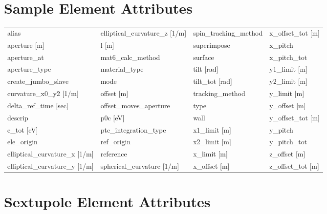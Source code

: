 \section{Sample Element Attributes}
 \label{s:list.sample}

 \begin{tabular}{llll} \toprule
alias                          & elliptical_curvature_z [1/m]   & spin_tracking_method           & x_offset_tot [m]               \\
aperture [m]                   & l [m]                          & superimpose                    & x_pitch                        \\
aperture_at                    & mat6_calc_method               & surface                        & x_pitch_tot                    \\
aperture_type                  & material_type                  & tilt [rad]                     & y1_limit [m]                   \\
create_jumbo_slave             & mode                           & tilt_tot [rad]                 & y2_limit [m]                   \\
curvature_x0_y2 [1/m]          & offset [m]                     & tracking_method                & y_limit [m]                    \\
delta_ref_time [sec]           & offset_moves_aperture          & type                           & y_offset [m]                   \\
descrip                        & p0c [eV]                       & wall                           & y_offset_tot [m]               \\
e_tot [eV]                     & ptc_integration_type           & x1_limit [m]                   & y_pitch                        \\
ele_origin                     & ref_origin                     & x2_limit [m]                   & y_pitch_tot                    \\
elliptical_curvature_x [1/m]   & reference                      & x_limit [m]                    & z_offset [m]                   \\
elliptical_curvature_y [1/m]   & spherical_curvature [1/m]      & x_offset [m]                   & z_offset_tot [m]               \\
 \bottomrule
 \end{tabular}
 \vfill

 \section{Sextupole Element Attributes}
 \label{s:list.sextupole}

